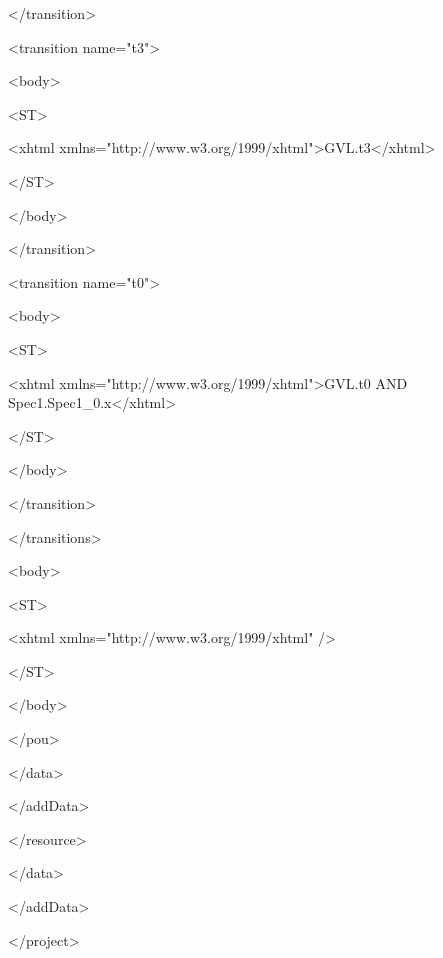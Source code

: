 </transition>

<transition name="t3">

 <body>

  <ST>

   <xhtml xmlns="http://www.w3.org/1999/xhtml">GVL.t3</xhtml>

  </ST>

 </body>

</transition>

<transition name="t0">

 <body>

  <ST>

   <xhtml xmlns="http://www.w3.org/1999/xhtml">GVL.t0 AND Spec1.Spec1\_0.x</xhtml>

  </ST>

 </body>

</transition>

</transitions>

<body>

<ST>

 <xhtml xmlns="http://www.w3.org/1999/xhtml" />

</ST>

</body>

</pou>

</data>

</addData>

</resource>

</data>

</addData>

</project>
